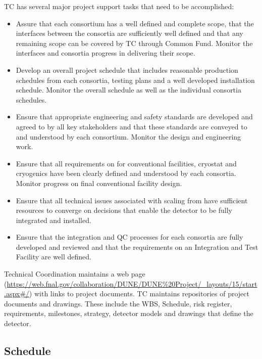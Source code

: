 TC has several major project support tasks that need to be accomplished:
\begin{itemize}
  \item Assure that each consortium has a well defined and complete
    scope, that the interfaces between the consortia are sufficiently
    well defined and that any remaining scope can be covered by TC
    through Common Fund. Monitor the interfaces and consortia progress
    in delivering their scope.
  \item Develop an overall project schedule that includes reasonable
    production schedules from each consortia, testing plans and a well
    developed installation schedule. Monitor the overall schedule as
    well as the individual consortia schedules.
  \item Ensure that appropriate engineering and safety standards are
    developed and agreed to by all key stakeholders and that these
    standards are conveyed to and understood by each
    consortium. Monitor the design and engineering work.
  \item Ensure that all  requirements on  for
    conventional facilities, cryostat and cryogenics have been clearly
    defined and understood by each consortia. Monitor 
    progress on final conventional facility design.
  \item Ensure that all technical issues associated with scaling from
     have sufficient resources to converge on
    decisions that enable the detector to be fully integrated and
    installed.
  \item Ensure that the integration and QC processes for each
    consortia are fully developed and reviewed and that the
    requirements on an Integration and Test Facility are well defined.
\end{itemize}

Technical Coordination maintains a web page
(\url{https://web.fnal.gov/collaboration/DUNE/DUNE\%20Project/\_layouts/15/start.aspx\#/})
with links to project documents. TC maintains repositories of project
documents and drawings. These include the WBS, Schedule, risk
register, requirements, milestones, strategy, detector models and
drawings that define the  detector.


\subsection{Schedule}
\label{sec:fdsp-coord-controls}

